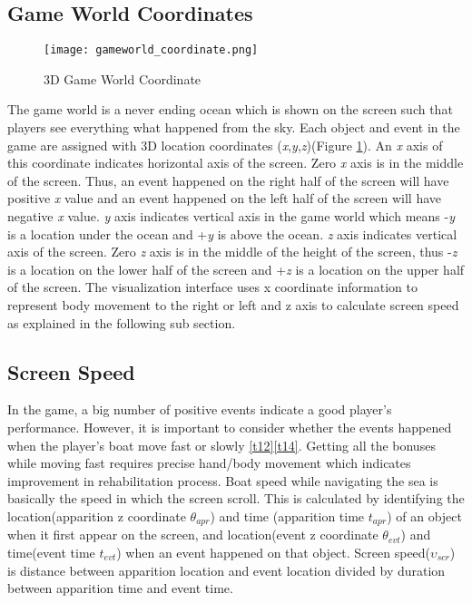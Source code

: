 \subsection{Game World Coordinates}
\begin{figure}[b]
\centering
\texttt{[image: gameworld\_coordinate.png]}
\caption{3D Game World Coordinate \label{game_coordinate}}
\end{figure}
The game world is a never ending ocean which is shown on the screen such that players see everything what happened from the sky. Each object and event in the game are assigned with 3D location coordinates (\textit{x},\textit{y},\textit{z})(Figure \ref{game_coordinate}). An \textit{x} axis of this coordinate indicates horizontal axis of the screen. Zero \textit{x} axis is in the middle of the screen. Thus, an event happened on the right half of the screen will have positive \textit{x} value and an event happened on the left half of the screen will have negative \textit{x} value. \textit{y} axis indicates vertical axis in the game world which means -\textit{y} is a location under the ocean and +\textit{y} is above the ocean. \textit{z} axis indicates vertical axis of the screen. Zero \textit{z} axis is in the middle of the height of the screen, thus -\textit{z} is a location on the lower half of the screen and +\textit{z} is a location on the upper half of the screen. The visualization interface uses x coordinate information to represent body movement to the right or left and z axis to calculate screen speed as explained in the following sub section.

\subsection{Screen Speed}
In the game, a big number of positive events indicate a good player's performance. However, it is important to consider whether the events happened when the player's boat move fast or slowly \ref{t12}\ref{t14}. Getting all the bonuses while moving fast requires precise hand/body movement which indicates improvement in rehabilitation process. Boat speed while navigating the sea is basically the speed in which the screen scroll. This is calculated by identifying the location(apparition z coordinate $\theta_{apr}$) and time (apparition time $\textit{t}_{apr}$) of an object when it first appear on the screen, and location(event z coordinate $\theta_{evt}$) and time(event time $\textit{t}_{evt}$) when an event happened on that object. Screen speed($\upsilon_{scr}$) is distance between apparition location and event location divided by duration between apparition time and event time.

